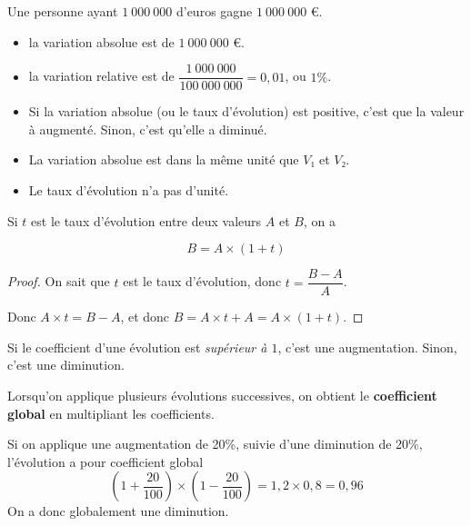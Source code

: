 \documentclass[
	classe=$2^{de}$
]{coursclass}
\begin{document}
\begin{exemple}
	Une personne ayant $1\ 000\ 000$ d'euros gagne $1\ 000\ 000$ €.

	\begin{itemize}
		\item la variation absolue est de $1\ 000\ 000$ €.
		\item la variation relative est de $\dfrac{1\ 000\ 000}{100\ 000\ 000} = 0,01$, ou $1\%$.
	\end{itemize}
\end{exemple}

\begin{remarque}
	\begin{itemize}
		\item Si la variation absolue (ou le taux d'évolution) est positive, c'est que la valeur à augmenté. Sinon, c'est qu'elle a diminué.
		\item La variation absolue est dans la même unité que $V₁$ et $V₂$.
		\item Le taux d'évolution n'a pas d'unité.
	\end{itemize}
\end{remarque}

\begin{propriete}
	Si $t$ est le taux d'évolution entre deux valeurs $A$ et $B$, on a

	$$ B = A × (1 + t) $$
\end{propriete}
\begin{proof}
	On sait que $t$ est le taux d'évolution, donc $t = \dfrac{B - A}{A}$.

	Donc $A × t = B - A$, et donc
	$B = A × t + A = A × (1 + t)$.
\end{proof}

\begin{remarque}
	Si le coefficient d'une évolution est \textit{supérieur à $1$}, c'est une augmentation. Sinon, c'est une diminution.
\end{remarque}

\begin{propriete}
	Lorsqu'on applique plusieurs évolutions successives, on obtient le \textbf{coefficient global} en multipliant les coefficients.
\end{propriete}

\begin{exemple}
	Si on applique une augmentation de 20\%, suivie d'une diminution de 20\%, l'évolution a pour coefficient global
	$$ \left(1 + \frac{20}{100}\right) × \left(1 - \frac{20}{100}\right) = 1,2 × 0,8 = 0,96 $$
	On a donc globalement une diminution.
\end{exemple}
\end{document}
